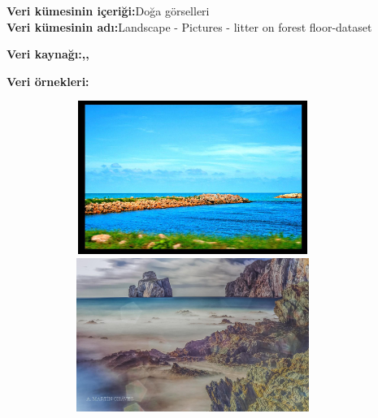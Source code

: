 \documentclass[12pt, a4paper]{article}
\begin{document}
				{\textbf{Veri kümesinin içeriği:}Doğa görselleri}\\
				 {\textbf{Veri kümesinin adı:}Landscape - Pictures - litter on forest floor-dataset}\\
				 {\textbf{Veri kaynağı:\cite{Landscape-Pictures},\cite{litter-on-forest-floor},\cite{weather-dataset}}\\
					 {\textbf{Veri örnekleri:}\\
				
						\begin{figure}[h]
							\centering
							\includegraphics[width=10cm,height=5cm]{00000000_(5).jpg}\\ 	
							\includegraphics[width=10cm,height=5cm]{00000024_(2).jpg}
							
						\end{figure}

						
						
}}
\end{document}
